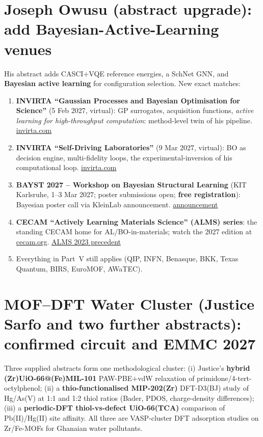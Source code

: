\documentclass[11pt,a4paper]{article}
\begin{document}
\section{Joseph Owusu (abstract upgrade): add Bayesian-Active-Learning venues}
His abstract adds CASCI$+$VQE reference energies, a SchNet GNN, and \textbf{Bayesian active learning} for configuration selection. New exact matches:
\begin{enumerate}[leftmargin=1.6em]
  \item \textbf{INVIRTA ``Gaussian Processes and Bayesian Optimisation for Science''} (5 Feb 2027, virtual): GP surrogates, acquisition functions, \emph{active learning for high-throughput computation}: method-level twin of his pipeline. \href{https://www.invirta.com/workshops/am/workshop-5-4}{invirta.com}
  \item \textbf{INVIRTA ``Self-Driving Laboratories''} (9 Mar 2027, virtual): BO as decision engine, multi-fidelity loops, the experimental-inversion of his computational loop. \href{https://www.invirta.com/workshops/am/workshop-5-13}{invirta.com}
  \item \textbf{BAYST 2027 -- Workshop on Bayesian Structural Learning} (KIT Karlsruhe, 1--3 Mar 2027; poster submissions open; \textbf{free registration}): Bayesian poster call via KleinLab announcement. \href{https://www.linkedin.com/posts/kleinlab-mbd_bayst-2027-activity-7474814477058891778-7WfC}{announcement}
  \item \textbf{CECAM ``Actively Learning Materials Science'' (ALMS) series}: the standing CECAM home for AL/BO-in-materials; watch the 2027 edition at \href{https://www.cecam.org/program}{cecam.org}. \href{https://www.cecam.org/workshop-details/actively-learning-materials-science-alms-2023-1212}{ALMS 2023 precedent}
  \item Everything in Part~V still applies (QIP, INFN, Benasque, BKK, Texas Quantum, BIRS, EuroMOF, AWaTEC).
\end{enumerate}

\section{MOF--DFT Water Cluster (Justice Sarfo and two further abstracts): confirmed circuit and EMMC 2027}
Three supplied abstracts form one methodological cluster: (i) Justice's \textbf{hybrid (Zr)UiO-66@(Fe)MIL-101} PAW-PBE$+$vdW relaxation of primidone/4-tert-octylphenol; (ii) a \textbf{thio-functionalised MIP-202(Zr)} DFT-D3(BJ) study of Hg/As(V) at 1:1 and 1:2 thiol ratios (Bader, PDOS, charge-density differences); (iii) a \textbf{periodic-DFT thiol-vs-defect UiO-66(TCA)} comparison of Pb(II)/Hg(II) site affinity. All three are VASP-cluster DFT adsorption studies on Zr/Fe-MOFs for Ghanaian water pollutants.
\end{document}
